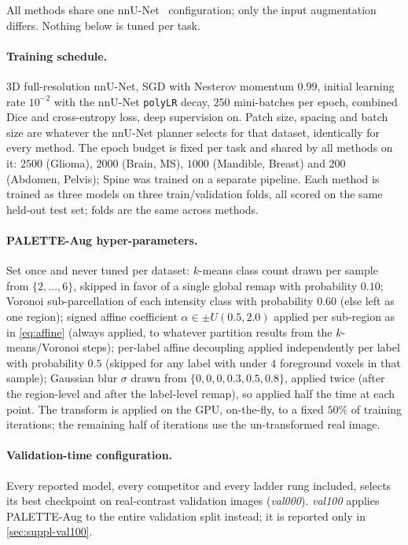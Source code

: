 All methods share one nnU-Net~\cite{isensee2021nnunet} configuration; only
the input augmentation differs. Nothing below is tuned per task.

\paragraph{Training schedule.} 3D full-resolution nnU-Net, SGD with Nesterov
momentum $0.99$, initial learning rate $10^{-2}$ with the nnU-Net
\texttt{polyLR} decay, $250$ mini-batches per epoch, combined Dice and
cross-entropy loss, deep supervision on. Patch size, spacing and batch size
are whatever the nnU-Net planner selects for that dataset, identically for
every method. The epoch budget is fixed per task and shared by all methods
on it: $2500$ (Glioma), $2000$ (Brain, MS), $1000$ (Mandible, Breast) and $200$ (Abdomen, Pelvis); Spine was trained on a separate pipeline.
Each method is trained as three models on three train/validation folds, all
scored on the same held-out test set; folds are the same across methods.

\paragraph{PALETTE-Aug hyper-parameters.} Set once and never tuned per dataset:
$k$-means class count drawn per sample from $\{2,\dots,6\}$, skipped in
favor of a single global remap with probability $0.10$; Voronoi
sub-parcellation of each intensity class with probability $0.60$ (else left
as one region); signed affine coefficient $\alpha \in \pm U(0.5, 2.0)$
applied per sub-region as in \cref{eq:affine} (always applied, to whatever
partition results from the $k$-means/Voronoi steps); per-label affine
decoupling applied independently per label with probability $0.5$ (skipped
for any label with under $4$ foreground voxels in that sample); Gaussian
blur $\sigma$ drawn from $\{0,0,0,0.3,0.5,0.8\}$, applied twice (after the
region-level and after the label-level remap), so applied half the time at
each point. The transform is applied on the GPU, on-the-fly, to a fixed
$50\%$ of training
iterations; the remaining half of iterations use the
un-transformed real image.

\paragraph{Validation-time configuration.} Every reported model, every
competitor and every ladder rung included, selects its best checkpoint on
real-contrast validation images (\emph{val000}). \emph{val100} applies
PALETTE-Aug to the entire validation split instead; it is reported only in
\cref{sec:suppl-val100}.

